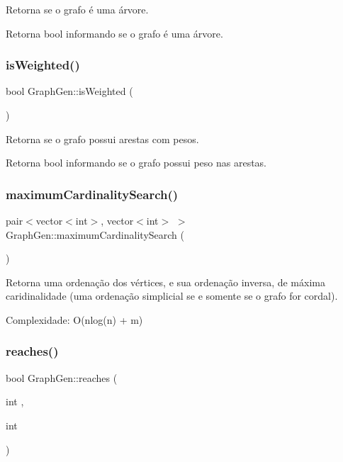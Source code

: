 Retorna se o grafo é uma árvore. \begin{DoxyReturn}{Retorna}
bool informando se o grafo é uma árvore. 
\end{DoxyReturn}
\mbox{\label{classGraphGen_aa0069b56cfa3e2d7d596bda9ba4ccc2b}} 
\subsubsection{\texorpdfstring{isWeighted()}{isWeighted()}}
{\footnotesize\ttfamily bool Graph\+Gen\+::is\+Weighted (\begin{DoxyParamCaption}{ }\end{DoxyParamCaption})}

Retorna se o grafo possui arestas com pesos. \begin{DoxyReturn}{Retorna}
bool informando se o grafo possui peso nas arestas. 
\end{DoxyReturn}
\mbox{\label{classGraphGen_a7811947062c0aa0fd1c56af0442dc9ad}} 
\subsubsection{\texorpdfstring{maximumCardinalitySearch()}{maximumCardinalitySearch()}}
{\footnotesize\ttfamily pair$<$vector$<$int$>$, vector$<$int$>$ $>$ Graph\+Gen\+::maximum\+Cardinality\+Search (\begin{DoxyParamCaption}{ }\end{DoxyParamCaption})\hspace{0.3cm}{\ttfamily [protected]}}

Retorna uma ordenação dos vértices, e sua ordenação inversa, de máxima caridinalidade (uma ordenação simplicial se e somente se o grafo for cordal).

Complexidade\+: O(nlog(n) + m) \mbox{\label{classGraphGen_a4fba74f3a12a3153843f550569981b0b}} 
\subsubsection{\texorpdfstring{reaches()}{reaches()}}
{\footnotesize\ttfamily bool Graph\+Gen\+::reaches (\begin{DoxyParamCaption}\item[{int}]{,  }\item[{int}]{ }\end{DoxyParamCaption})}

